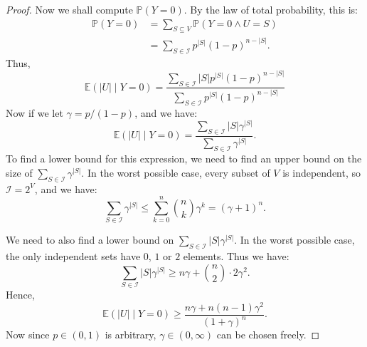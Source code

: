 \documentclass{unswmaths}
\begin{document}
\begin{proof}
    Now we shall compute $\mathbb{P}(Y=0)$. By the law of total
    probability, this is:
    \begin{align*}
        \mathbb{P}(Y=0) &= \sum_{S \subseteq V} \mathbb{P}(Y=0 \wedge U = S)\\
                        &= \sum_{S \in \mathcal{I}} p^{|S|}(1-p)^{n-|S|}.
    \end{align*}
    Thus,
    \begin{equation*}
        \mathbb{E}(|U|\;|\;Y=0) = \frac{\sum_{S \in \mathcal{I}}|S|p^{|S|}(1-p)^{n-|S|}}{\sum_{S \in \mathcal{I}}p^{|S|}(1-p)^{n-|S|}}
    \end{equation*}
    Now if we let $\gamma = p/(1-p)$, and we have:
    \begin{equation*}
        \mathbb{E}(|U|\;|\;Y=0) = \frac{\sum_{S \in \mathcal{I}}|S|\gamma^{|S|}}{\sum_{S \in \mathcal{I}}\gamma^{|S|}}.
    \end{equation*}
    To find a lower bound for this expression, we need to find an upper bound on
    the size of $\sum_{S\in\mathcal{I}} \gamma^{|S|}$.
    In the worst possible case, every subset of $V$ is independent,
    so $\mathcal{I} = 2^{V}$, and we have:
    \begin{equation*}
        \sum_{S \in \mathcal{I}} \gamma^{|S|} \leq \sum_{k=0}^n {n\choose k} \gamma^k = (\gamma+1)^n.
    \end{equation*}
    
    We need to also find a lower bound on $\sum_{S \in \mathcal{I}} |S|\gamma^{|S|}$.
    In the worst possible case, the only independent sets have $0$, $1$ or $2$ elements. 
    Thus we have:
    \begin{equation*}
        \sum_{S \in \mathcal{I}} |S|\gamma^{|S|} \geq n\gamma+{n\choose 2}\cdot 2\gamma^2.
    \end{equation*}
    Hence,
    \begin{equation*}
        \mathbb{E}(|U|\;|\;Y=0) \geq \frac{n\gamma+n(n-1)\gamma^2}{(1+\gamma)^n}.
    \end{equation*}
    Now since $p \in (0,1)$ is arbitrary, $\gamma \in (0,\infty)$ can be chosen
    freely. 
\end{proof}
\end{document}

